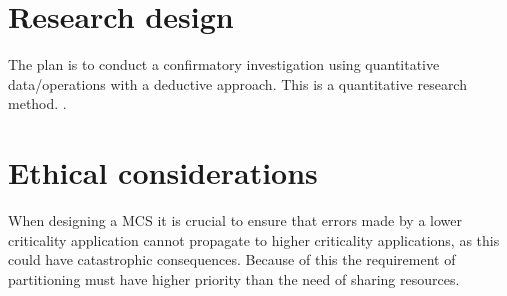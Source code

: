 \section{Research design}
\label{sec:research}
The plan is to conduct a confirmatory investigation using quantitative data/operations with a deductive approach. This is a quantitative research method. \cite{hakansson2013}.\\ %



\section{Ethical considerations}
When designing a MCS it is crucial to ensure that errors made by a lower criticality application cannot propagate to higher criticality applications, as this could have catastrophic consequences. Because of this the requirement of partitioning must have higher priority than the need of sharing resources.

